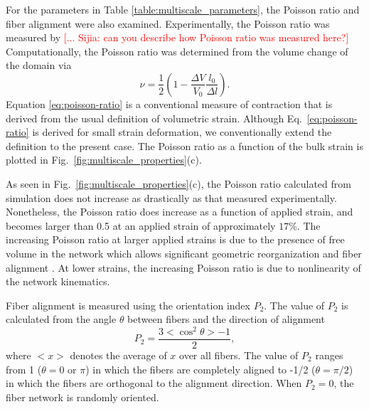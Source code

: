 \documentclass[]{interact}
\newcommand{\red}[1]{\textcolor{red}{[#1]}}
\begin{document}
For the parameters in Table \ref{table:multiscale_parameters}, the Poisson ratio and fiber alignment were also examined. Experimentally, the Poisson ratio was measured by \red{... Sijia: can you describe how Poisson ratio was measured here?} Computationally, the Poisson ratio was determined from the volume change of the domain via
%
\begin{equation}
\nu = \frac{1}{2}\left(1- \frac{\Delta V}{V_0}\frac{l_0}{\Delta l}\right).
\label{eq:poisson-ratio}
\end{equation}
%
Equation \ref{eq:poisson-ratio} is a conventional measure of contraction that is derived from the usual definition of volumetric strain. Although Eq.\ \eqref{eq:poisson-ratio} is derived for small strain deformation, we conventionally extend the definition to the present case. The Poisson ratio as a function of the bulk strain is plotted in Fig.\ \ref{fig:multiscale_properties}(c). 

As seen in Fig.\ \ref{fig:multiscale_properties}(c), the Poisson ratio calculated from simulation does not increase as drastically as that measured experimentally. Nonetheless, the Poisson ratio does increase as a function of applied strain, and becomes larger than 0.5 at an applied strain of approximately $17\%$. The increasing Poisson ratio at larger applied strains is due to the presence of free volume in the network which allows significant geometric reorganization and fiber alignment \citep{Vader:2009js}. At lower strains, the increasing Poisson ratio is due to nonlinearity of the network kinematics. 

Fiber alignment is measured using the orientation index $P_2$. The value of $P_2$ is calculated from the angle $\theta$ between fibers and the direction of alignment
%
\begin{equation}
P_2 = \frac{3 <\cos^2\theta> - 1}{2},
\label{eq:P2_simulation}
\end{equation}
%
where $<x>$ denotes the average of $x$ over all fibers. The value of $P_2$ ranges from 1 ($\theta=0$ or $\pi$) in which the fibers are completely aligned to -1/2 ($\theta=\pi/2$) in which the fibers are orthogonal to the alignment direction. When $P_2=0$, the fiber network is randomly oriented. 
\end{document}
